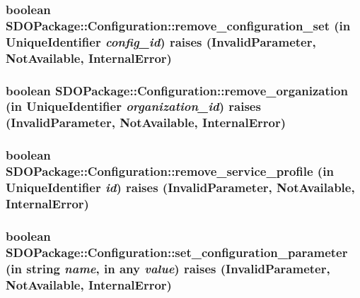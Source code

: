 \subsubsection[{remove\_\-configuration\_\-set}]{\setlength{\rightskip}{0pt plus 5cm}boolean SDOPackage::Configuration::remove\_\-configuration\_\-set (in {\bf UniqueIdentifier} {\em config\_\-id})  raises (InvalidParameter, NotAvailable, InternalError)}\label{interfaceSDOPackage_1_1Configuration_a2b8fee9e3106cb08c72590f3716d809e}
\subsubsection[{remove\_\-organization}]{\setlength{\rightskip}{0pt plus 5cm}boolean SDOPackage::Configuration::remove\_\-organization (in {\bf UniqueIdentifier} {\em organization\_\-id})  raises (InvalidParameter, NotAvailable, InternalError)}\label{interfaceSDOPackage_1_1Configuration_a3b891d4f199c83a774643beda3a25d76}
\subsubsection[{remove\_\-service\_\-profile}]{\setlength{\rightskip}{0pt plus 5cm}boolean SDOPackage::Configuration::remove\_\-service\_\-profile (in {\bf UniqueIdentifier} {\em id})  raises (InvalidParameter, NotAvailable, InternalError)}\label{interfaceSDOPackage_1_1Configuration_a9d80d9a2a1ab5cb4bfa670d8b648e3fc}
\subsubsection[{set\_\-configuration\_\-parameter}]{\setlength{\rightskip}{0pt plus 5cm}boolean SDOPackage::Configuration::set\_\-configuration\_\-parameter (in string {\em name}, \/  in any {\em value})  raises (InvalidParameter, NotAvailable, InternalError)}\label{interfaceSDOPackage_1_1Configuration_ae9314a2cc5743932d9cc44c41393bf35}
